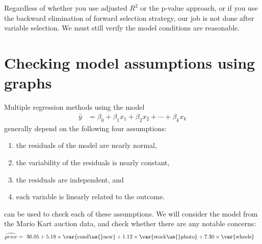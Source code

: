 Regardless of whether you use adjusted $R^2$ or the p-value approach, or if you use the backward elimination of forward selection strategy, our job is not done after variable selection. We must still verify the model conditions are reasonable.




\section{Checking model assumptions using graphs}
\label{multipleRegressionModelAssumptions}


Multiple regression methods using the model
\begin{align*}
\hat{y} &= \beta_0 + \beta_1x_1 + \beta_2x_2 + \cdots + \beta_kx_k
\end{align*}
generally depend on the following four assumptions:
\begin{enumerate}
\setlength{\itemsep}{0mm}
\item the residuals of the model are nearly normal,
\item the variability of the residuals is nearly constant,
\item the residuals are independent, and
\item each variable is linearly related to the outcome.
\end{enumerate}
 can be used to check each of these assumptions. We will consider the model from the Mario Kart auction data, and check whether there are any notable concerns:
\begin{align*}
\widehat{price} &= \ 36.05 + 5.18 \times \text{\var{cond\us{}new}} + 1.12 \times \text{\var{stock\us{}photo}} + 7.30 \times \text{\var{wheels}}
\end{align*}

